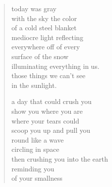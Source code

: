 \begin{verse}
today was gray \\
with the sky the color \\
of a cold steel blanket \\
mediocre light reflecting \\
everywhere off of every \\
surface of the snow \\
illuminating everything in us. \\
those things we can't see \\
in the sunlight.

a day that could crush you \\
show you where you are \\
where your tears could \\
scoop you up and pull you \\
round like a wave \\
circling in space \\
then crushing you into the earth \\
reminding you  \\
of your smallness
\end{verse}
